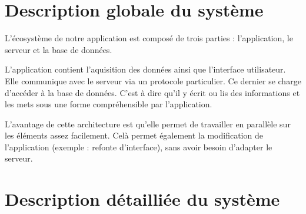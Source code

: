 \section{Description globale du système}

L'écosystème de notre application est composé de trois parties : l'application, le serveur et la base de données.
\par
L'application contient l'aquisition des données ainsi que l'interface utilisateur. Elle communique avec le serveur via un protocole particulier.
Ce dernier se charge d'accéder à la base de données. C'est à dire qu'il y écrit ou lis des informations et les mets sous une forme compréhensible par l'application.
\par
L'avantage de cette architecture est qu'elle permet de travailler en parallèle sur les éléments assez facilement. Celà permet également la modification de l'application (exemple : refonte d'interface), sans avoir besoin d'adapter le serveur.
\section{Description détailliée du système}

